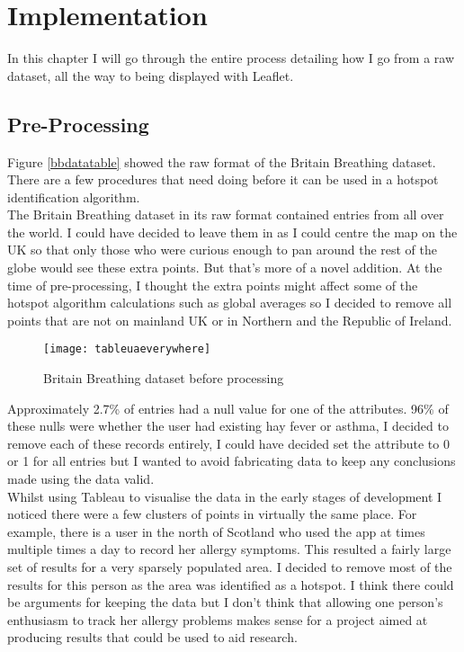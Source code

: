 \chapter{Implementation}
\label{cha:impl}

In this chapter I will go through the entire process detailing how I go from a raw dataset, all the way to being displayed with Leaflet.

\section{Pre-Processing}

Figure \ref{bbdatatable} showed the raw format of the Britain Breathing dataset. There are a few procedures that need doing before it can be used in a hotspot identification algorithm.\\

The Britain Breathing dataset in its raw format contained entries from all over the world. I could have decided to leave them in as I could centre the map on the UK so that only those who were curious enough to pan around the rest of the globe would see these extra points. But that's more of a novel addition. At the time of pre-processing, I thought the extra points might affect some of the hotspot algorithm calculations such as global averages so I decided to remove all points that are not on mainland UK or in Northern and the Republic of Ireland.\\

\begin{figure}[H]
\begin{center}
\texttt{[image: tableuaeverywhere]}
\caption{Britain Breathing dataset before processing}
\label{fig:RTv1}
\end{center}
\end{figure}

Approximately 2.7\% of entries had a null value for one of the attributes. 96\% of these nulls were  whether the user had existing hay fever or asthma, I decided to remove each of these records entirely, I could have decided set the attribute to 0 or 1 for all entries but I wanted to avoid fabricating data to keep any conclusions made using the data valid.\\

Whilst using Tableau to visualise the data in the early stages of development I noticed there were a few clusters of points in virtually the same place. For example, there is a user in the north of Scotland who used the app at times multiple times a day to record her allergy symptoms. This resulted a fairly large set of results for a very sparsely populated area. I decided to remove most of the results for this person as the area was identified as a hotspot. I think there could be arguments for keeping the data but I don't think that allowing one person's enthusiasm to track her allergy problems makes sense for a project aimed at producing results that could be used to aid research.\\

